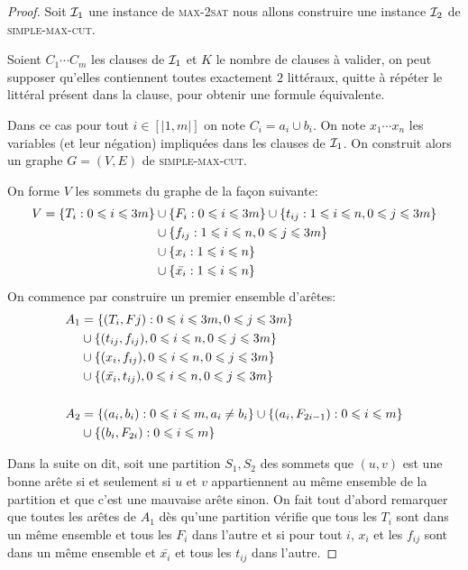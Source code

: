 \documentclass{standalone}
\begin{document}
\begin{proof}
	Soit $\mathcal I_1$ une instance de \textsc{max-2sat} nous allons construire une instance $\mathcal I_2$ de \textsc{simple-max-cut}.
	
	Soient $C_1 \cdots C_m$ les clauses de $\mathcal I_1$ et $K$ le nombre de clauses à valider, on peut supposer qu'elles contiennent toutes exactement $2$ littéraux, quitte à répéter le littéral présent dans la clause, pour obtenir une formule équivalente.
	
	Dans ce cas pour tout $i \in [|1, m|]$ on note $C_i = a_i \cup b_i$. On note $x_1 \cdots x_n$ les variables (et leur négation) impliquées dans les clauses de $\mathcal I_1$. On construit alors un graphe  $G=(V,E)$ de \textsc{simple-max-cut}.
	
	On forme $V$ les sommets du graphe de la façon suivante:
	\begin{align*}
		V = \left\{ T_i : 0 \leqslant i \leqslant 3m\right\} &\cup \left\{ F_i : 0 \leqslant i \leqslant 3m\right\} \cup \left\{ t_{ij} : 1 \leqslant i \leqslant n, 0\leqslant j \leqslant 3m\right\} \\ &\cup \left\{ f_{ij} : 1 \leqslant i \leqslant n, 0\leqslant j \leqslant 3m\right\} \\
			&\cup\left\{ x_i : 1 \leqslant i \leqslant n\right\} \\
			&\cup\left\{ \bar{x_i} : 1 \leqslant i \leqslant n\right\}
	\end{align*}
	On commence par construire un premier ensemble d'arêtes:	
	\begin{align*}
		A_1 &= \left\{ (T_i, Fj) : 0 \leqslant i \leqslant 3m, 0 \leqslant j \leqslant 3m \right\} \\
			&\cup \left\{ (t_{ij}, f_{ij}), 0 \leqslant i \leqslant n, 0 \leqslant j \leqslant 3m\right\} \\
			&\cup \left\{ (x_i, f_{ij}), 0 \leqslant i \leqslant n, 0 \leqslant j \leqslant 3m\right\} \\
			&\cup \left\{ (\bar{x_i}, t_{ij}), 0 \leqslant i \leqslant n, 0 \leqslant j \leqslant 3m\right\} \\
			\\
		A_2 &= \left\{ (a_i,b_i): 0 \leqslant i \leqslant m, a_i \not= b_i\right\} \cup \left\{ (a_i, F_{2i-1}) : 0 \leqslant i \leqslant m\right\} \\
			&\cup \left\{ (b_i, F_{2i}) : 0 \leqslant i \leqslant m\right\}
	\end{align*}
	
	Dans la suite on dit, soit une partition $S_1, S_2$ des sommets que $(u, v)$ est une bonne arête si et seulement si $u$ et $v$ appartiennent au même ensemble de la partition et que c'est une mauvaise arête sinon. On fait tout d'abord remarquer que toutes les arêtes de $A_1$ dès qu'une partition vérifie que tous les $T_i$ sont dans un même ensemble et tous les $F_i$ dans l'autre et si pour tout $i$, $x_i$ et les $f_{ij}$ sont dans un même ensemble et $\bar{x_i}$ et tous les $t_{ij}$ dans l'autre.
	

\end{proof}
\end{document}
